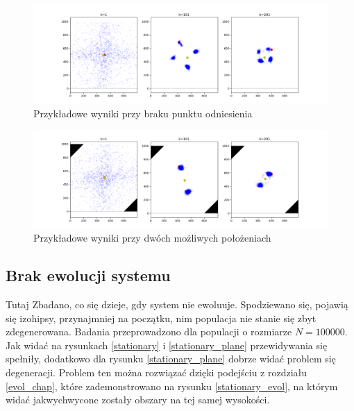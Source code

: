 \begin{figure}[H]
	\begin{center}
		\includegraphics[width=15cm]{./no_pivot.png}
		\caption{Przykładowe wyniki przy braku punktu odniesienia}
		\label{no_pivot}
	\end{center}
\end{figure}

\begin{figure}[H]
	\begin{center}
		\includegraphics[width=15cm]{./one_pivot.png}
		\caption{Przykładowe wyniki przy dwóch możliwych położeniach}
		\label{one_pivot}
	\end{center}
\end{figure}

\subsection{Brak ewolucji systemu}
Tutaj Zbadano, co się dzieje, gdy system nie ewoluuje. Spodziewano się, pojawią się izohipsy, przynajmniej na początku, nim populacja nie stanie się zbyt zdegenerowana. Badania przeprowadzono dla populacji o rozmiarze $N=100000$. Jak widać na rysunkach \ref{stationary} i \ref{stationary_plane} przewidywania się spełniły, dodatkowo dla rysunku \ref{stationary_plane} dobrze widać problem się degeneracji. Problem ten można rozwiązać dzięki podejściu z rozdziału \ref{evol_chap}, które zademonstrowano na rysunku \ref{stationary_evol}, na którym widać jakwychwycone zostały obszary na tej samej wysokości.

